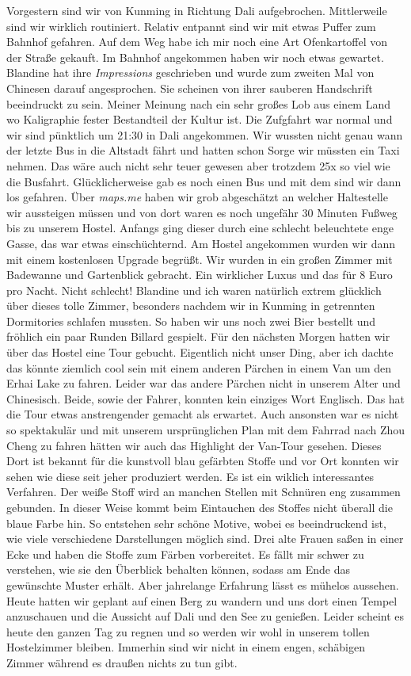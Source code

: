 \documentclass[11pt]{book}
\begin{document}
Vorgestern sind wir von Kunming in Richtung Dali aufgebrochen. Mittlerweile sind wir wirklich routiniert. Relativ 
entpannt sind wir mit etwas Puffer zum Bahnhof gefahren. Auf dem Weg habe ich mir noch eine Art Ofenkartoffel 
von der Straße gekauft. Im Bahnhof angekommen haben wir noch etwas gewartet. Blandine hat ihre \emph{Impressions}
geschrieben und wurde zum zweiten Mal von Chinesen darauf angesprochen. Sie scheinen von ihrer sauberen Handschrift
beeindruckt zu sein. Meiner Meinung nach ein sehr großes Lob aus einem Land wo Kaligraphie fester Bestandteil 
der Kultur ist. Die Zufgfahrt war normal und wir sind pünktlich um 21:30 in Dali angekommen. Wir wussten nicht genau 
wann der letzte Bus in die Altstadt fährt und hatten schon Sorge wir müssten ein Taxi nehmen. Das wäre auch nicht 
sehr teuer gewesen aber trotzdem 25x so viel wie die Busfahrt. Glücklicherweise gab es noch einen Bus und mit dem 
sind wir dann los gefahren. Über \emph{maps.me} haben wir grob abgeschätzt an welcher Haltestelle wir aussteigen 
müssen und von dort waren es noch ungefähr 30 Minuten Fußweg bis zu unserem Hostel. Anfangs ging dieser durch 
eine schlecht beleuchtete enge Gasse, das war etwas einschüchternd. Am Hostel angekommen wurden wir dann mit einem 
kostenlosen Upgrade begrüßt. Wir wurden in ein großen Zimmer mit Badewanne und Gartenblick gebracht. Ein wirklicher 
Luxus und das für 8 Euro pro Nacht. Nicht schlecht! Blandine und ich waren natürlich extrem glücklich über dieses 
tolle Zimmer, besonders nachdem wir in Kunming in getrennten Dormitories schlafen mussten. So haben wir uns noch 
zwei Bier bestellt und fröhlich ein paar Runden Billard gespielt. 
Für den nächsten Morgen hatten wir über das Hostel eine Tour gebucht. Eigentlich nicht unser Ding, aber ich dachte 
das könnte ziemlich cool sein mit einem anderen Pärchen in einem Van um den Erhai Lake zu fahren. Leider war das 
andere Pärchen nicht in unserem Alter und Chinesisch. Beide, sowie der Fahrer, konnten kein einziges Wort Englisch.
Das hat die Tour etwas anstrengender gemacht als erwartet. Auch ansonsten war es nicht so spektakulär und mit unserem 
ursprünglichen Plan mit dem Fahrrad nach Zhou Cheng zu fahren hätten wir auch das Highlight der Van-Tour gesehen.
Dieses Dort ist bekannt für die kunstvoll blau gefärbten Stoffe und vor Ort konnten wir sehen wie diese seit 
jeher produziert werden. Es ist ein wiklich interessantes Verfahren. Der weiße Stoff wird an manchen Stellen mit 
Schnüren eng zusammen gebunden. In dieser Weise kommt beim Eintauchen des Stoffes nicht überall die blaue Farbe 
hin. So entstehen sehr schöne Motive, wobei es beeindruckend ist, wie viele verschiedene Darstellungen möglich sind.
Drei alte Frauen saßen in einer Ecke und haben die Stoffe zum Färben vorbereitet. Es fällt mir schwer zu verstehen, 
wie sie den Überblick behalten können, sodass am Ende das gewünschte Muster erhält. Aber jahrelange Erfahrung 
lässt es mühelos aussehen.
Heute hatten wir geplant auf einen Berg zu wandern und uns dort einen Tempel anzuschauen und die Aussicht auf 
Dali und den See zu genießen. Leider scheint es heute den ganzen Tag zu regnen und so werden wir wohl in unserem 
tollen Hostelzimmer bleiben. Immerhin sind wir nicht in einem engen, schäbigen Zimmer während es draußen nichts zu 
tun gibt.
\end{document}
